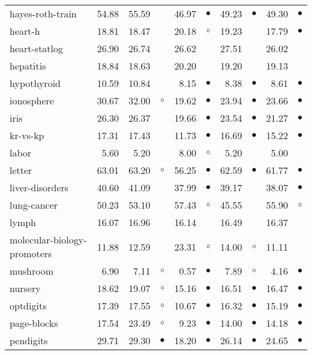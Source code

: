 \begin{table}[thb]
{\begin{tabular}{lrr@{\hspace{0.1cm}}cr@{\hspace{0.1cm}}cr@{\hspace{0.1cm}}cr@{\hspace{0.1cm}}c}
hayes-roth-train & 54.88 & 55.59 &           & 46.97 & $\bullet$ & 49.23 & $\bullet$ & 49.30 & $\bullet$\\
heart-h & 18.81 & 18.47 &           & 20.18 &   $\circ$ & 19.23 &           & 17.79 & $\bullet$\\
heart-statlog & 26.90 & 26.74 &           & 26.62 &           & 27.51 &           & 26.02 &          \\
hepatitis & 18.84 & 18.63 &           & 20.20 &           & 19.20 &           & 19.13 &          \\
hypothyroid & 10.59 & 10.84 &           &  8.15 & $\bullet$ &  8.38 & $\bullet$ &  8.61 & $\bullet$\\
ionosphere & 30.67 & 32.00 &   $\circ$ & 19.62 & $\bullet$ & 23.94 & $\bullet$ & 23.66 & $\bullet$\\
iris & 26.30 & 26.37 &           & 19.66 & $\bullet$ & 23.54 & $\bullet$ & 21.27 & $\bullet$\\
kr-vs-kp & 17.31 & 17.43 &           & 11.73 & $\bullet$ & 16.69 & $\bullet$ & 15.22 & $\bullet$\\
labor &  5.60 &  5.20 &           &  8.00 &   $\circ$ &  5.20 &           &  5.00 &          \\
letter & 63.01 & 63.20 &   $\circ$ & 56.25 & $\bullet$ & 62.59 & $\bullet$ & 61.77 & $\bullet$\\
liver-disorders & 40.60 & 41.09 &           & 37.99 & $\bullet$ & 39.17 &           & 38.07 & $\bullet$\\
lung-cancer & 50.23 & 53.10 &           & 57.43 &   $\circ$ & 45.55 &           & 55.90 &   $\circ$\\
lymph & 16.07 & 16.96 &           & 16.14 &           & 16.49 &           & 16.37 &          \\
molecular-biology-promoters & 11.88 & 12.59 &           & 23.31 &   $\circ$ & 14.00 &   $\circ$ & 11.11 &          \\
mushroom &  6.90 &  7.11 &   $\circ$ &  0.57 & $\bullet$ &  7.89 &   $\circ$ &  4.16 & $\bullet$\\
nursery & 18.62 & 19.07 &   $\circ$ & 15.16 & $\bullet$ & 16.51 & $\bullet$ & 16.47 & $\bullet$\\
optdigits & 17.39 & 17.55 &   $\circ$ & 10.67 & $\bullet$ & 16.32 & $\bullet$ & 15.19 & $\bullet$\\
page-blocks & 17.54 & 23.49 &   $\circ$ &  9.23 & $\bullet$ & 14.00 & $\bullet$ & 14.18 & $\bullet$\\
pendigits & 29.71 & 29.30 & $\bullet$ & 18.20 & $\bullet$ & 26.14 & $\bullet$ & 24.65 & $\bullet$\\

\end{tabular}}
\end{table}
